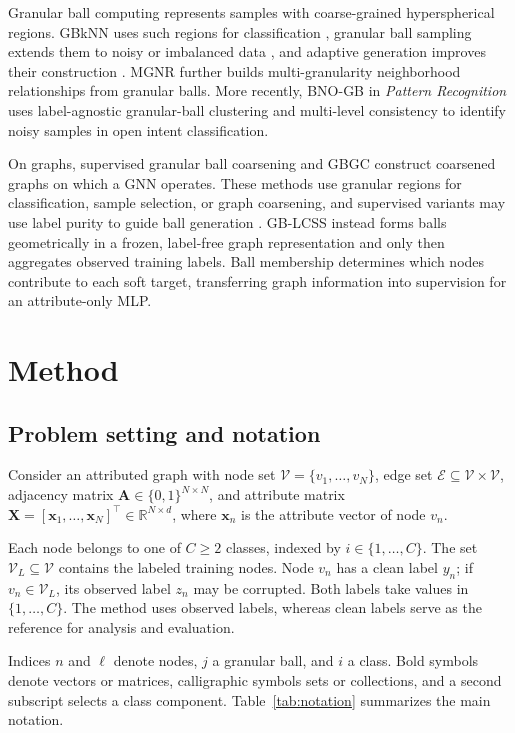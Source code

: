 \documentclass[times,review,10pt]{elsarticle}
\theoremstyle{definition}
\theoremstyle{plain}
\begin{document}
Granular ball computing represents samples with coarse-grained hyperspherical regions. GBkNN uses such regions for classification \cite{ref13}, granular ball sampling extends them to noisy or imbalanced data \cite{ref15}, and adaptive generation improves their construction \cite{ref16}. MGNR \cite{ref58} further builds multi-granularity neighborhood relationships from granular balls. More recently, BNO-GB in \emph{Pattern Recognition} \cite{pr2026bnogb} uses label-agnostic granular-ball clustering and multi-level consistency to identify noisy samples in open intent classification.

On graphs, supervised granular ball coarsening \cite{ref66} and GBGC \cite{ref67} construct coarsened graphs on which a GNN operates. These methods use granular regions for classification, sample selection, or graph coarsening, and supervised variants may use label purity to guide ball generation \cite{ref13,ref15,ref16}. GB-LCSS instead forms balls geometrically in a frozen, label-free graph representation and only then aggregates observed training labels. Ball membership determines which nodes contribute to each soft target, transferring graph information into supervision for an attribute-only MLP.
\section{Method}\label{sec:3}

\subsection{Problem setting and notation}\label{sec:3.1}

Consider an attributed graph with node set \(\mathcal V=\{v_1,\ldots,v_N\}\), edge set \(\mathcal E\subseteq\mathcal V\times\mathcal V\), adjacency matrix \(\mathbf A\in\{0,1\}^{N\times N}\), and attribute matrix \(\mathbf X=[\mathbf x_1,\ldots,\mathbf x_N]^\top\in\mathbb R^{N\times d}\), where \(\mathbf x_n\) is the attribute vector of node \(v_n\).

Each node belongs to one of \(C\geq2\) classes, indexed by \(i\in\{1,\ldots,C\}\). The set \(\mathcal V_L\subseteq\mathcal V\) contains the labeled training nodes. Node \(v_n\) has a clean label \(y_n\); if \(v_n\in\mathcal V_L\), its observed label \(z_n\) may be corrupted. Both labels take values in \(\{1,\ldots,C\}\). The method uses observed labels, whereas clean labels serve as the reference for analysis and evaluation.

Indices \(n\) and \(\ell\) denote nodes, \(j\) a granular ball, and \(i\) a class. Bold symbols denote vectors or matrices, calligraphic symbols sets or collections, and a second subscript selects a class component. Table~\ref{tab:notation} summarizes the main notation.
\end{document}
